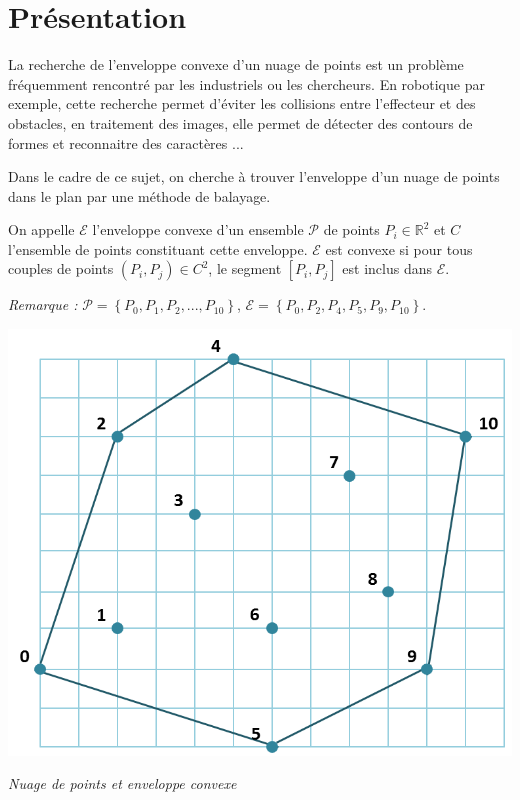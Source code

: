 \documentclass[10pt,fleqn]{article} %
\begin{document}

\vspace{1cm}
\pagestyle{fancy}
\thispagestyle{plain}

\section{Présentation}

\ifprof
\else
\noindent
\begin{minipage}[c]{.7\linewidth}
La recherche de l'enveloppe convexe d'un nuage de points est un problème fréquemment rencontré par les industriels ou les chercheurs. En robotique par exemple, cette recherche permet d'éviter les collisions entre l'effecteur et des obstacles, en traitement des images, elle permet de détecter des contours de formes et reconnaitre des caractères ...

Dans le cadre de ce sujet, on cherche à trouver l'enveloppe d'un nuage de points dans le plan par une méthode de balayage. 
\begin{defi}
On appelle $\mathcal{E}$ l'enveloppe convexe d'un ensemble $\mathcal{P}$ de points $P_i\in \mathbb{R}^2$ et $C$ l'ensemble de points constituant cette enveloppe. 
$\mathcal{E}$ est convexe si pour tous couples de points  $(P_i,P_j) \in {C}^2$, le segment $[P_i,P_j]$ est inclus dans $\mathcal{E}$.
\end{defi}

\textit{Remarque :} $\mathcal{P}=\left\{P_0,P_1,P_2, ..., P_{10} \right\}$, $\mathcal{E}=\left\{P_0, P_2, P_4, P_5, P_9, P_{10} \right\}$.

\end{minipage} \hfill
\begin{minipage}[c]{.28\linewidth}
\begin{center}
\includegraphics[width=.95\textwidth]{images/enveloppe}

\textit{Nuage de points et enveloppe convexe}
\end{center}
\end{minipage} 
\end{document}
